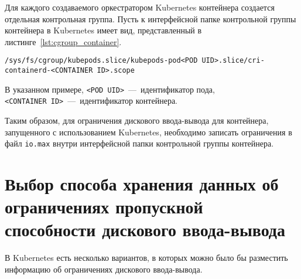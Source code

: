 Для каждого создаваемого оркестратором Kubernetes контейнера создается отдельная контрольная группа. Пусть к интерфейсной папке контрольной группы контейнера в Kubernetes имеет вид, представленный в листинге~\ref{lst:cgroup_container}.

\begin{lstlisting}[label=lst:cgroup_container, caption={Пример пути к интерфейсной папке контрольной группы контейнера}]
/sys/fs/cgroup/kubepods.slice/kubepods-pod<POD UID>.slice/cri-containerd-<CONTAINER ID>.scope
\end{lstlisting}

В указанном примере, \texttt{<POD~UID>}~---~идентификатор пода, \texttt{<CONTAINER~ID>}~---~идентификатор контейнера.

Таким образом, для ограничения дискового ввода-вывода для контейнера, запущенного с использованием Kubernetes, необходимо записать ограничения в файл \texttt{io.max} внутри интерфейсной папки контрольной группы контейнера.

\section{Выбор способа хранения данных об ограничениях пропускной способности дискового ввода-вывода}

В Kubernetes есть несколько вариантов, в которых можно было бы разместить информацию об ограничениях дискового ввода-вывода.

